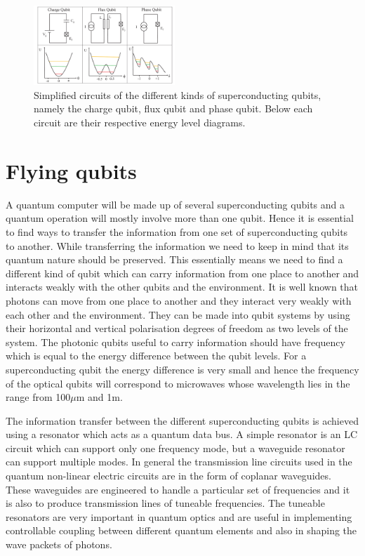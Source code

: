 \documentclass[twocolumn, aps, rmp, amsmath, amssymb, nofootinbib, superscriptaddress, longbibliography, floatfix, table-of-contents, eqsecnum]{revtex4-1}
\begin{document}
\begin{figure}[!htbp]
\includegraphics[width=0.475\textwidth]{superconducting_qubits}
\caption{Simplified circuits of the different kinds of superconducting qubits, namely the charge qubit, flux qubit and phase qubit. Below each circuit are their respective energy level diagrams.} 
\end{figure}

\section{Flying qubits}

A quantum computer will be made up of several superconducting qubits and a quantum operation will mostly involve more than one qubit. Hence it is essential to find ways to transfer the information from one set of superconducting qubits to another. While transferring the information we need to keep in mind that its quantum nature should be preserved. This essentially means we need to find a different kind of qubit which can carry information from one place to another and interacts weakly with the other qubits and the environment. It is well known that photons can move from one place to another and they interact very weakly with each other and the environment. They can be made into qubit systems by using their horizontal and vertical polarisation degrees of freedom as two levels of the system. The photonic qubits useful to carry information should have frequency which is equal to the energy difference between the qubit levels. For a superconducting qubit the energy difference is very small and hence the frequency of the optical qubits will correspond to microwaves whose wavelength lies in the range from 100$\mu$m and 1m.

The information transfer between the different superconducting qubits is achieved using a resonator which acts as a quantum data bus. A simple resonator is an LC circuit which can support only one frequency mode, but a waveguide resonator can support multiple modes. In general the transmission line circuits used in the quantum non-linear electric circuits are in the form of coplanar waveguides. These waveguides are engineered to handle a particular set of frequencies and it is also to produce transmission lines of tuneable frequencies. The tuneable resonators are very important in quantum optics and are useful in implementing controllable coupling between different quantum elements and also in shaping the wave packets of photons. 
\end{document}
